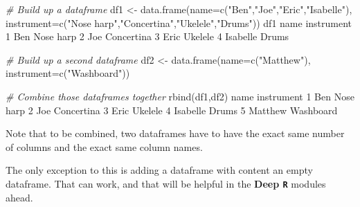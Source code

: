 \documentclass[
]{book}
\newenvironment{Shaded}{\begin{snugshade}}{\end{snugshade}}
\newcommand{\AttributeTok}[1]{\textcolor[rgb]{0.77,0.63,0.00}{#1}}
\newcommand{\CommentTok}[1]{\textcolor[rgb]{0.56,0.35,0.01}{\textit{#1}}}
\newcommand{\DecValTok}[1]{\textcolor[rgb]{0.00,0.00,0.81}{#1}}
\newcommand{\FunctionTok}[1]{\textcolor[rgb]{0.00,0.00,0.00}{#1}}
\newcommand{\NormalTok}[1]{#1}
\newcommand{\OtherTok}[1]{\textcolor[rgb]{0.56,0.35,0.01}{#1}}
\newcommand{\StringTok}[1]{\textcolor[rgb]{0.31,0.60,0.02}{#1}}
\begin{document}
\begin{Shaded}
\begin{Highlighting}[]
\CommentTok{\# Build up a dataframe}
\NormalTok{df1 }\OtherTok{\textless{}{-}} \FunctionTok{data.frame}\NormalTok{(}\AttributeTok{name=}\FunctionTok{c}\NormalTok{(}\StringTok{"Ben"}\NormalTok{,}\StringTok{"Joe"}\NormalTok{,}\StringTok{"Eric"}\NormalTok{,}\StringTok{"Isabelle"}\NormalTok{),}
                  \AttributeTok{instrument=}\FunctionTok{c}\NormalTok{(}\StringTok{"Nose harp"}\NormalTok{,}\StringTok{"Concertina"}\NormalTok{,}\StringTok{"Ukelele"}\NormalTok{,}\StringTok{"Drums"}\NormalTok{))}
\NormalTok{df1}
\NormalTok{      name instrument}
\DecValTok{1}\NormalTok{      Ben  Nose harp}
\DecValTok{2}\NormalTok{      Joe Concertina}
\DecValTok{3}\NormalTok{     Eric    Ukelele}
\DecValTok{4}\NormalTok{ Isabelle      Drums}
\end{Highlighting}
\end{Shaded}

\begin{Shaded}
\begin{Highlighting}[]
\CommentTok{\# Build up a second dataframe}
\NormalTok{df2 }\OtherTok{\textless{}{-}} \FunctionTok{data.frame}\NormalTok{(}\AttributeTok{name=}\FunctionTok{c}\NormalTok{(}\StringTok{"Matthew"}\NormalTok{),}
                  \AttributeTok{instrument=}\FunctionTok{c}\NormalTok{(}\StringTok{"Washboard"}\NormalTok{))}
\end{Highlighting}
\end{Shaded}

\begin{Shaded}
\begin{Highlighting}[]
\CommentTok{\# Combine those dataframes together}
\FunctionTok{rbind}\NormalTok{(df1,df2)}
\NormalTok{      name instrument}
\DecValTok{1}\NormalTok{      Ben  Nose harp}
\DecValTok{2}\NormalTok{      Joe Concertina}
\DecValTok{3}\NormalTok{     Eric    Ukelele}
\DecValTok{4}\NormalTok{ Isabelle      Drums}
\DecValTok{5}\NormalTok{  Matthew  Washboard}
\end{Highlighting}
\end{Shaded}

Note that to be combined, two dataframes have to have the exact same number of columns and the exact same column names.

The only exception to this is adding a dataframe with content an empty dataframe. That can work, and that will be helpful in the \textbf{Deep \texttt{R}} modules ahead.
\end{document}
